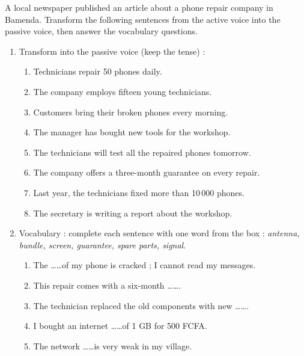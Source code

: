 \documentclass[11pt]{article}
\begin{document}
\begin{exercice}
A local newspaper published an article about a phone repair company in Bamenda. Transform the following sentences from the active voice into the passive voice, then answer the vocabulary questions.

\begin{enumerate}
\item Transform into the passive voice (keep the tense) :
\begin{enumerate}
\item Technicians repair 50 phones daily.
\item The company employs fifteen young technicians.
\item Customers bring their broken phones every morning.
\item The manager has bought new tools for the workshop.
\item The technicians will test all the repaired phones tomorrow.
\item The company offers a three-month guarantee on every repair.
\item Last year, the technicians fixed more than 10\,000 phones.
\item The secretary is writing a report about the workshop.
\end{enumerate}
\item Vocabulary : complete each sentence with one word from the box : \emph{antenna, bundle, screen, guarantee, spare parts, signal}.
\begin{enumerate}
\item The \ldots\ldots of my phone is cracked ; I cannot read my messages.
\item This repair comes with a six-month \ldots\ldots.
\item The technician replaced the old components with new \ldots\ldots.
\item I bought an internet \ldots\ldots of 1 GB for 500 FCFA.
\item The network \ldots\ldots is very weak in my village.
\end{enumerate}
\end{enumerate}
\end{exercice}
\end{document}
